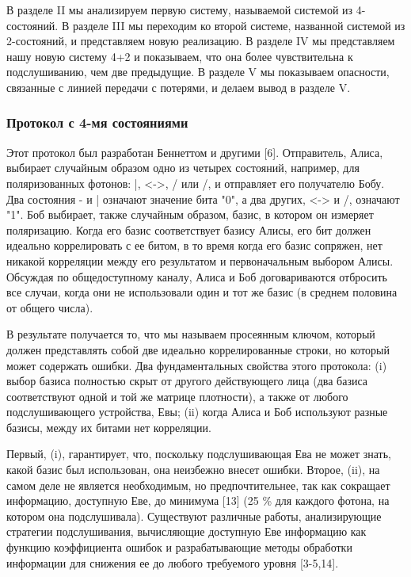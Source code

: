 В разделе II мы анализируем первую систему, называемой системой  из 4-состояний. В разделе III мы переходим ко второй системе, названной системой из 2-состояний, и представляем новую реализацию.
В разделе IV мы представляем нашу новую систему 4+2 и показываем, что она более чувствительна к подслушиванию, чем две предыдущие. В разделе V мы показываем опасности, связанные с линией передачи с потерями, и делаем вывод в разделе V.

\subsubsection{Протокол с 4-мя состояниями}

Этот протокол был разработан Беннеттом и другими [6]. Отправитель, Алиса, выбирает случайным образом одно из четырех состояний, например, для поляризованных фотонов: |, <->, / или /, и отправляет его получателю Бобу. Два состояния - и | означают значение бита "0", а два других, <-> и /, означают "1". Боб выбирает, также случайным образом, базис, в котором он измеряет поляризацию. Когда его базис соответствует базису Алисы, его бит должен идеально коррелировать с ее битом, в то время когда его базис сопряжен, нет никакой корреляции между его результатом и первоначальным выбором Алисы. Обсуждая по общедоступному каналу, Алиса и Боб договариваются отбросить все случаи, когда они не использовали один и тот же базис (в среднем половина от общего числа).

В результате получается то, что мы называем просеянным ключом, который должен представлять собой две идеально коррелированные строки, но который может содержать ошибки. Два фундаментальных свойства этого протокола: (i) выбор базиса полностью скрыт от другого действующего лица (два базиса соответствуют одной и той же матрице плотности), а также от любого подслушивающего устройства, Евы; (ii) когда Алиса и Боб используют разные базисы, между их битами нет корреляции.

Первый, (i), гарантирует, что, поскольку подслушивающая Ева не может знать, какой базис был использован, она неизбежно внесет ошибки. Второе, (ii), на самом деле не является необходимым, но предпочтительнее, так как сокращает информацию, доступную Еве, до минимума [13] (25 \% для каждого фотона, на котором она подслушивала). Существуют различные работы, анализирующие стратегии подслушивания, вычисляющие доступную Еве информацию как функцию коэффициента ошибок и разрабатывающие методы обработки информации для снижения ее до любого требуемого уровня [3-5,14].

